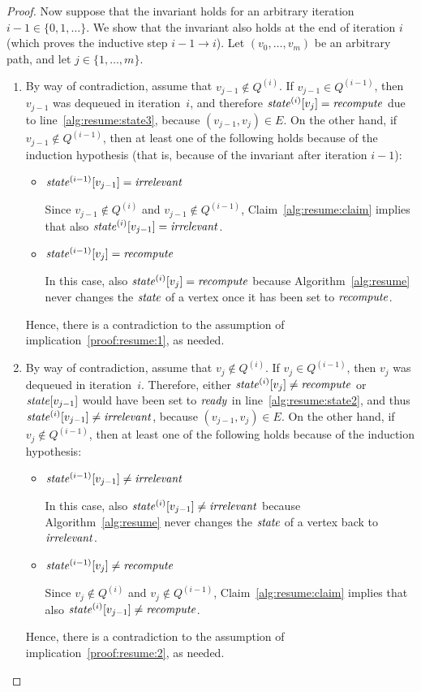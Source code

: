 \documentclass[paper=letter,fontsize=11pt,captions=tableheading]{scrartcl}
\numberwithin{equation}{section}
\theoremstyle{algorithm}
\theoremstyle{plain}
\theoremstyle{nonumberplain}
\newtheorem{proof}{Proof}
\begin{document}
\begin{proof}
Now suppose that the invariant holds for an arbitrary iteration $i - 1 \in \{ 0, 1, \dots \}$. We show that the invariant also holds at the end of iteration $i$ (which proves the inductive step $i - 1 \to i$). Let $(v_0, \dots, v_m)$ be an arbitrary path, and let $j \in \{ 1, \dots, m\}$.

\begin{enumerate}
	\item By way of contradiction, assume that $v_{j-1} \notin Q^{(i)}$. If $v_{j-1} \in Q^{(i-1)}$, then $v_{j-1}$ was dequeued in iteration~$i$, and therefore $\mathit{state}^{(i)}[v_j] = \mathit{recompute}$ due to line~\ref{alg:resume:state3}, because $(v_{j-1}, v_j) \in E$. On the other hand, if $v_{j-1} \notin Q^{(i-1)}$, then at least one of the following holds because of the induction hypothesis (that is, because of the invariant after iteration $i - 1$):
	\begin{itemize}
		\item $\mathit{state}^{(i-1)}[v_{j-1}] = \mathit{irrelevant}$

		Since $v_{j-1} \notin Q^{(i)}$ and $v_{j-1} \notin Q^{(i-1)}$, Claim~\ref{alg:resume:claim} implies that also $\mathit{state}^{(i)}[v_{j-1}] = \mathit{irrelevant}$.

		\item $\mathit{state}^{(i-1)}[v_j] = \mathit{recompute}$

		In this case, also $\mathit{state}^{(i)}[v_j] = \mathit{recompute}$ because Algorithm~\ref{alg:resume} never changes the $\mathit{state}$ of a vertex once it has been set to $\mathit{recompute}$.
	\end{itemize}
	Hence, there is a contradiction to the assumption of implication~\eqref{proof:resume:1}, as needed.

	\item By way of contradiction, assume that $v_j \notin Q^{(i)}$. If $v_j \in Q^{(i-1)}$, then $v_j$ was dequeued in iteration~$i$. Therefore, either $\mathit{state}^{(i)}[v_j] \neq \mathit{recompute}$ or $\mathit{state}[v_{j-1}]$ would have been set to $\mathit{ready}$ in line~\ref{alg:resume:state2}, and thus $\mathit{state}^{(i)}[v_{j-1}] \neq \mathit{irrelevant}$, because $(v_{j-1}, v_j) \in E$. On the other hand, if $v_j \notin Q^{(i-1)}$, then at least one of the following holds because of the induction hypothesis:
	\begin{itemize}
		\item $\mathit{state}^{(i-1)}[v_{j-1}] \neq \mathit{irrelevant}$

		In this case, also $\mathit{state}^{(i)}[v_{j-1}] \neq \mathit{irrelevant}$ because Algorithm~\ref{alg:resume} never changes the $\mathit{state}$ of a vertex back to $\mathit{irrelevant}$.

		\item $\mathit{state}^{(i-1)}[v_j] \neq \mathit{recompute}$

		Since $v_j \notin Q^{(i)}$ and $v_j \notin Q^{(i-1)}$, Claim~\ref{alg:resume:claim} implies that also $\mathit{state}^{(i)}[v_{j-1}] \neq \mathit{recompute}$.
	\end{itemize}
	Hence, there is a contradiction to the assumption of implication~\eqref{proof:resume:2}, as needed.
\end{enumerate}
\end{proof}
\end{document}
